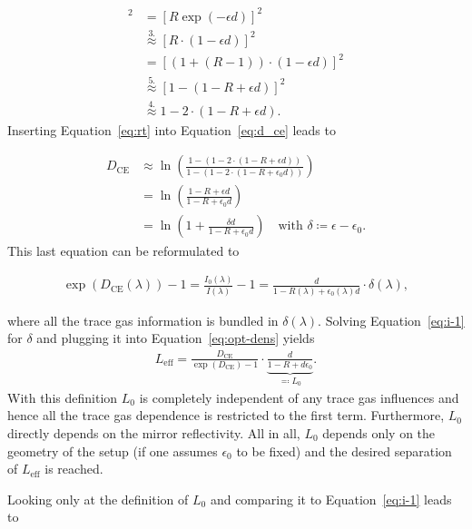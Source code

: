 \begin{align}
  [RT]^2 & = [R \exp(-\epsilon d)]^2 \nonumber\\
         & \stackrel{3.}{\approx} [R \cdot(1 - \epsilon d)]^2 \nonumber\\
         & = [(1 + (R - 1))\cdot (1 - \epsilon d)]^2 \nonumber\\
         & \stackrel{5.}{\approx} [1 - (1 - R + \epsilon d)]^2 \nonumber\\
         & \stackrel{4.}{\approx} 1 - 2 \cdot (1 - R + \epsilon d)\label{eq:rt}.
\end{align}
Inserting Equation~\eqref{eq:rt} into Equation~\eqref{eq:d_ce} leads to

\begin{align}
  D_{\text{CE}} & \approx \ln \left ( \frac{1 - (1 - 2\cdot ( 1- R +
  \epsilon d))}{1 - (1 - 2 \cdot (1 - R + \epsilon_0 d))}\right)\\
  & = \ln \left ( \frac{1 - R + \epsilon d}{1 - R + \epsilon_0
    d}\right) \\
  & = \ln \left ( 1 + \frac{ \delta d}{1 - R + \epsilon_0 d}\right) \quad
    \text{with } \delta \coloneqq \epsilon - \epsilon_0.
\end{align}
This last equation can be reformulated to

\begin{align}
  \exp(D_{\text{CE}}(\lambda)) - 1 = \frac{I_0(\lambda)}{I(\lambda)} -
  1 = \frac{d}{1 - R(\lambda) + \epsilon_0(\lambda) d} \cdot
  \delta(\lambda)\label{eq:i-1}, 
\end{align}

where all the trace gas information is bundled in
$\delta(\lambda)$. Solving Equation~\eqref{eq:i-1} for $\delta$ and
plugging it into Equation~\eqref{eq:opt-dens} yields
\begin{align}
  L_{\text{eff}} = \frac{D_{\text{CE}}}{\exp(D_{\text{CE}}) - 1} \cdot
  \underbrace{\frac{d}{1 - R + d\epsilon_0}}_{\eqqcolon L_0}.
\end{align}
With this definition $L_0$ is completely independent of any
trace gas influences and hence all the trace gas dependence is
restricted to the first term. Furthermore, $L_0$ directly depends on
the mirror reflectivity. All in all, $L_0$ depends only on the geometry
of the setup (if one assumes $\epsilon_0$ to be fixed) and the desired
separation of $L_{\text{eff}}$ is reached.

Looking only at the definition of $L_0$ and comparing it to
Equation~\eqref{eq:i-1} leads to


